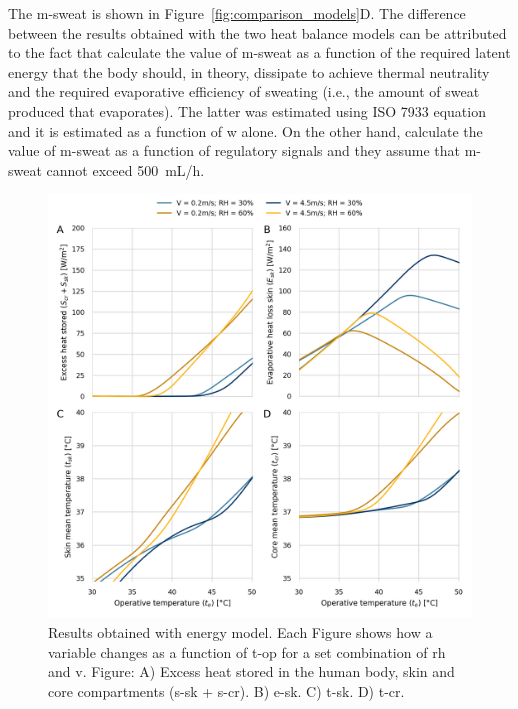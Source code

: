 The \acf{m-sweat} is shown in Figure~\ref{fig:comparison_models}D\@.
The difference between the results obtained with the two heat balance models can be attributed to the fact that \citeauthor{Jay2015} calculate the value of \ac{m-sweat} as a function of the required latent energy that the body should, in theory, dissipate to achieve thermal neutrality and the required evaporative efficiency of sweating (i.e., the amount of sweat produced that evaporates).
The latter was estimated using ISO 7933 equation and it is estimated as a function of \ac{w} alone.
On the other hand, \citeauthor{GaggeSET} calculate the value of \ac{m-sweat} as a function of regulatory signals and they assume that \ac{m-sweat} cannot exceed 500~mL/h.

\begin{figure}[thb!]
    \centering
    \includegraphics[width=\textwidth]{figures/results_model_2}
    \caption{Results obtained with  energy model.
    Each Figure shows how a variable changes as a function of \ac{t-op} for a set combination of \ac{rh} and \ac{v}.
    Figure: A)  Excess heat stored in the human body, skin and core compartments (\ac{s-sk} + \ac{s-cr}).
    B) \Acf{e-sk}.
    C) \Acf{t-sk}.
    D) \Acf{t-cr}.}
    \label{fig:results_model_2}
\end{figure}

